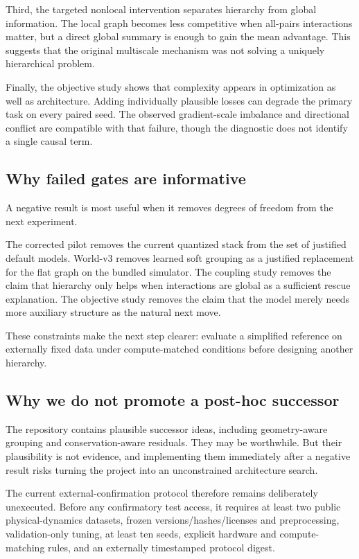 \documentclass[10pt]{article}
\begin{document}
Third, the targeted nonlocal intervention separates hierarchy from global information. The local graph becomes less competitive when all-pairs interactions matter, but a direct global summary is enough to gain the mean advantage. This suggests that the original multiscale mechanism was not solving a uniquely hierarchical problem.

Finally, the objective study shows that complexity appears in optimization as well as architecture. Adding individually plausible losses can degrade the primary task on every paired seed. The observed gradient-scale imbalance and directional conflict are compatible with that failure, though the diagnostic does not identify a single causal term.

\subsection{Why failed gates are informative}

A negative result is most useful when it removes degrees of freedom from the next experiment.

The corrected pilot removes the current quantized stack from the set of justified default models. World-v3 removes learned soft grouping as a justified replacement for the flat graph on the bundled simulator. The coupling study removes the claim that hierarchy only helps when interactions are global as a sufficient rescue explanation. The objective study removes the claim that the model merely needs more auxiliary structure as the natural next move.

These constraints make the next step clearer: evaluate a simplified reference on externally fixed data under compute-matched conditions before designing another hierarchy.

\subsection{Why we do not promote a post-hoc successor}

The repository contains plausible successor ideas, including geometry-aware grouping and conservation-aware residuals. They may be worthwhile. But their plausibility is not evidence, and implementing them immediately after a negative result risks turning the project into an unconstrained architecture search.

The current external-confirmation protocol therefore remains deliberately unexecuted. Before any confirmatory test access, it requires at least two public physical-dynamics datasets, frozen versions/hashes/licenses and preprocessing, validation-only tuning, at least ten seeds, explicit hardware and compute-matching rules, and an externally timestamped protocol digest.
\end{document}
